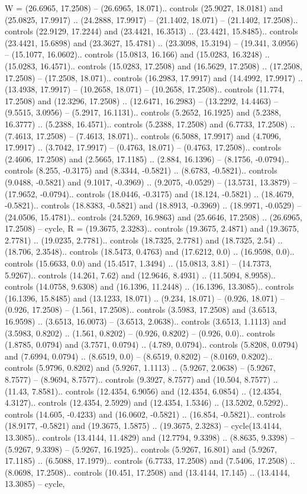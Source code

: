 {W} = {(26.6965, 17.2508) -- (26.6965, 18.071).. controls (25.9027, 18.0181) and (25.0825, 17.9917) .. (24.2888, 17.9917) -- (21.1402, 18.071) -- (21.1402, 17.2508).. controls (22.9129, 17.2244) and (23.4421, 16.3513) .. (23.4421, 15.8485).. controls (23.4421, 15.6898) and (23.3627, 15.4781) .. (23.3098, 15.3194) -- (19.341, 3.0956) -- (15.1077, 16.0602).. controls (15.0813, 16.166) and (15.0283, 16.3248) .. (15.0283, 16.4571).. controls (15.0283, 17.2508) and (16.5629, 17.2508) .. (17.2508, 17.2508) -- (17.2508, 18.071).. controls (16.2983, 17.9917) and (14.4992, 17.9917) .. (13.4938, 17.9917) -- (10.2658, 18.071) -- (10.2658, 17.2508).. controls (11.774, 17.2508) and (12.3296, 17.2508) .. (12.6471, 16.2983) -- (13.2292, 14.4463) -- (9.5515, 3.0956) -- (5.2917, 16.1131).. controls (5.2652, 16.1925) and (5.2388, 16.3777) .. (5.2388, 16.4571).. controls (5.2388, 17.2508) and (6.7733, 17.2508) .. (7.4613, 17.2508) -- (7.4613, 18.071).. controls (6.5088, 17.9917) and (4.7096, 17.9917) .. (3.7042, 17.9917) -- (0.4763, 18.071) -- (0.4763, 17.2508).. controls (2.4606, 17.2508) and (2.5665, 17.1185) .. (2.884, 16.1396) -- (8.1756, -0.0794).. controls (8.255, -0.3175) and (8.3344, -0.5821) .. (8.6783, -0.5821).. controls (9.0488, -0.5821) and (9.1017, -0.3969) .. (9.2075, -0.0529) -- (13.5731, 13.3879) -- (17.9652, -0.0794).. controls (18.0446, -0.3175) and (18.124, -0.5821) .. (18.4679, -0.5821).. controls (18.8383, -0.5821) and (18.8913, -0.3969) .. (18.9971, -0.0529) -- (24.0506, 15.4781).. controls (24.5269, 16.9863) and (25.6646, 17.2508) .. (26.6965, 17.2508) -- cycle},
{R} = {(19.3675, 2.3283).. controls (19.3675, 2.4871) and (19.3675, 2.7781) .. (19.0235, 2.7781).. controls (18.7325, 2.7781) and (18.7325, 2.54) .. (18.706, 2.3548).. controls (18.5473, 0.4763) and (17.6212, 0.0) .. (16.9598, 0.0).. controls (15.6633, 0.0) and (15.4517, 1.3494) .. (15.0813, 3.81) -- (14.7373, 5.9267).. controls (14.261, 7.62) and (12.9646, 8.4931) .. (11.5094, 8.9958).. controls (14.0758, 9.6308) and (16.1396, 11.2448) .. (16.1396, 13.3085).. controls (16.1396, 15.8485) and (13.1233, 18.071) .. (9.234, 18.071) -- (0.926, 18.071) -- (0.926, 17.2508) -- (1.561, 17.2508).. controls (3.5983, 17.2508) and (3.6513, 16.9598) .. (3.6513, 16.0073) -- (3.6513, 2.0638).. controls (3.6513, 1.1113) and (3.5983, 0.8202) .. (1.561, 0.8202) -- (0.926, 0.8202) -- (0.926, 0.0).. controls (1.8785, 0.0794) and (3.7571, 0.0794) .. (4.789, 0.0794).. controls (5.8208, 0.0794) and (7.6994, 0.0794) .. (8.6519, 0.0) -- (8.6519, 0.8202) -- (8.0169, 0.8202).. controls (5.9796, 0.8202) and (5.9267, 1.1113) .. (5.9267, 2.0638) -- (5.9267, 8.7577) -- (8.9694, 8.7577).. controls (9.3927, 8.7577) and (10.504, 8.7577) .. (11.43, 7.8581).. controls (12.4354, 6.9056) and (12.4354, 6.0854) .. (12.4354, 4.3127).. controls (12.4354, 2.5929) and (12.4354, 1.5346) .. (13.5202, 0.5292).. controls (14.605, -0.4233) and (16.0602, -0.5821) .. (16.854, -0.5821).. controls (18.9177, -0.5821) and (19.3675, 1.5875) .. (19.3675, 2.3283) -- cycle(13.4144, 13.3085).. controls (13.4144, 11.4829) and (12.7794, 9.3398) .. (8.8635, 9.3398) -- (5.9267, 9.3398) -- (5.9267, 16.1925).. controls (5.9267, 16.801) and (5.9267, 17.1185) .. (6.5088, 17.1979).. controls (6.7733, 17.2508) and (7.5406, 17.2508) .. (8.0698, 17.2508).. controls (10.451, 17.2508) and (13.4144, 17.145) .. (13.4144, 13.3085) -- cycle},

